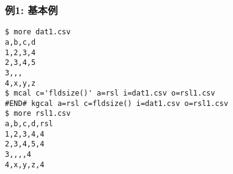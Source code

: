 \subsubsection*{例1: 基本例}



\begin{Verbatim}[baselinestretch=0.7,frame=single]
$ more dat1.csv
a,b,c,d
1,2,3,4
2,3,4,5
3,,,
4,x,y,z
$ mcal c='fldsize()' a=rsl i=dat1.csv o=rsl1.csv
#END# kgcal a=rsl c=fldsize() i=dat1.csv o=rsl1.csv
$ more rsl1.csv
a,b,c,d,rsl
1,2,3,4,4
2,3,4,5,4
3,,,,4
4,x,y,z,4
\end{Verbatim}
